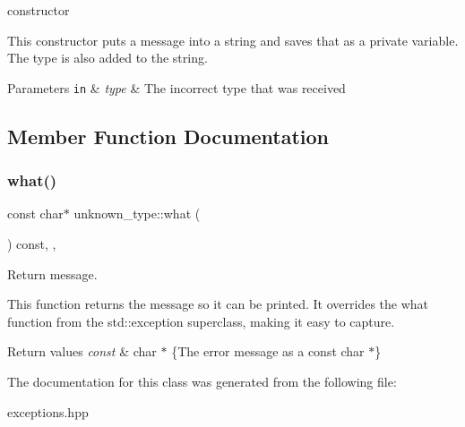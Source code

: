 constructor 

This constructor puts a message into a string and saves that as a private variable. The type is also added to the string.


\begin{DoxyParams}[1]{Parameters}
\mbox{\tt in}  & {\em type} & The incorrect type that was received \\
\hline
\end{DoxyParams}


\subsection{Member Function Documentation}
\mbox{\label{classunknown__type_a95f8c551c7bf001353d4a68b6874650d}} 
\subsubsection{\texorpdfstring{what()}{what()}}
{\footnotesize\ttfamily const char$\ast$ unknown\+\_\+type\+::what (\begin{DoxyParamCaption}{ }\end{DoxyParamCaption}) const\hspace{0.3cm}{\ttfamily [inline]}, {\ttfamily [override]}, {\ttfamily [noexcept]}}



Return message. 

This function returns the message so it can be printed. It overrides the what function from the std\+::exception superclass, making it easy to capture.


\begin{DoxyRetVals}{Return values}
{\em const} & char $\ast$ \{The error message as a const char $\ast$\} \\
\hline
\end{DoxyRetVals}


The documentation for this class was generated from the following file\+:\begin{DoxyCompactItemize}
\item 
exceptions.\+hpp\end{DoxyCompactItemize}
